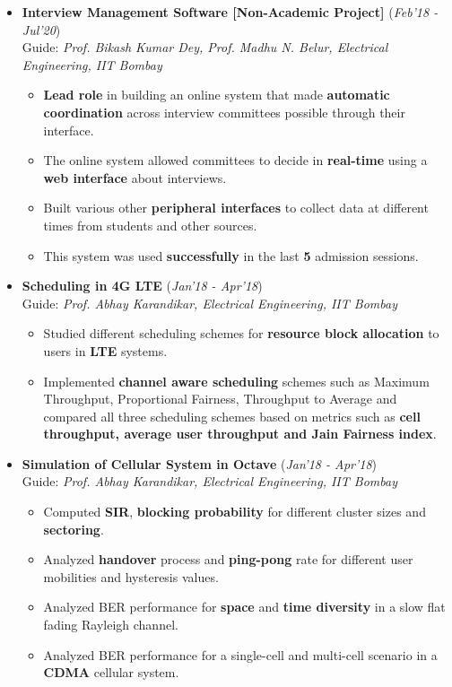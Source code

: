 \documentclass[10pt]{article}
\begin{document}
\begin{itemize}[leftmargin=0.4cm]

\item \textbf{Interview Management Software   \hspace{0.05cm} [Non-Academic Project]} 
\hfill{(\textit{Feb'18 - Jul'20})}\\
Guide: \textit{Prof. Bikash Kumar Dey, Prof. Madhu N. Belur, Electrical Engineering, IIT Bombay}

\begin{itemize}

	\item \textbf{Lead role }in building an online system that made \textbf{automatic
coordination }across interview committees possible through their interface.
	\item The online system allowed committees to decide in \textbf{real-time} using a \textbf{ web interface} about interviews.
	\item Built various other \textbf{peripheral
interfaces} to collect data at different times from students and other sources.
	\item This system was used \textbf{successfully} in the last \textbf{5} admission sessions.
\end{itemize}


	
\item \textbf{Scheduling in 4G LTE }
\hfill{(\textit{Jan'18 - Apr'18})}\\
Guide: \textit{Prof. Abhay Karandikar, Electrical Engineering, IIT Bombay}

	\begin{itemize}
	\item Studied different scheduling schemes for \textbf{resource block allocation} to users in \textbf{LTE} systems.
	\item Implemented \textbf{channel aware scheduling} schemes such as Maximum Throughput, Proportional Fairness, Throughput to Average and compared all three scheduling schemes based on metrics such as \textbf{cell throughput, average user throughput and Jain Fairness index}.
    \end{itemize}

\item \textbf{Simulation of Cellular System in Octave}
\hfill{(\textit{Jan'18 - Apr'18})}\\
Guide: \textit{Prof. Abhay Karandikar, Electrical Engineering, IIT Bombay}
	\begin{itemize}
	\item Computed \textbf{SIR}, \textbf{blocking probability} for different cluster sizes and \textbf{sectoring}.
	\item Analyzed \textbf{handover} process and \textbf{ping-pong} rate for different user mobilities and hysteresis values.
	\item Analyzed BER performance for \textbf{space} and \textbf{time diversity} in a slow flat fading Rayleigh channel.
	\item Analyzed BER performance for a single-cell and multi-cell scenario in a \textbf{CDMA} cellular system.
    \end{itemize}



\end{itemize}
\end{document}

